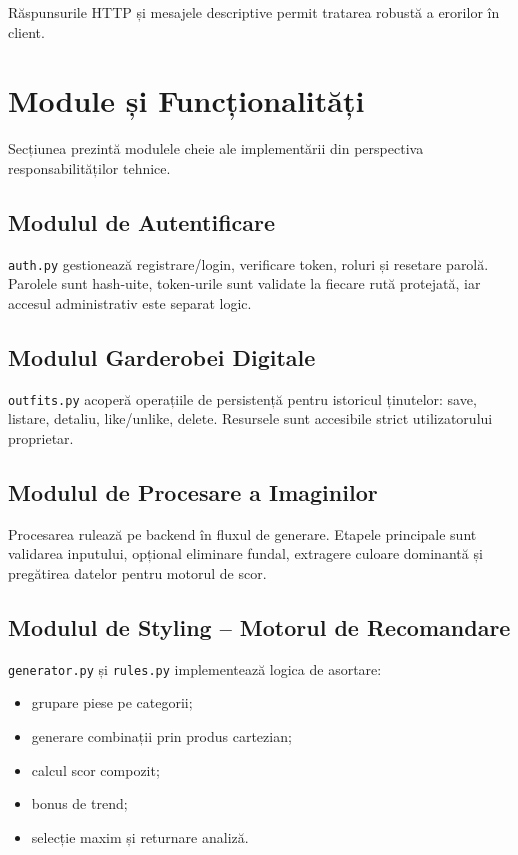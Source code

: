 Răspunsurile HTTP și mesajele descriptive permit tratarea robustă a erorilor în client.

\section{Module și Funcționalități}

Secțiunea prezintă modulele cheie ale implementării din perspectiva responsabilităților tehnice.

\subsection{Modulul de Autentificare}

\texttt{auth.py} gestionează registrare/login, verificare token, roluri și resetare parolă. Parolele sunt hash-uite, token-urile sunt validate la fiecare rută protejată, iar accesul administrativ este separat logic.

\subsection{Modulul Garderobei Digitale}

\texttt{outfits.py} acoperă operațiile de persistență pentru istoricul ținutelor: save, listare, detaliu, like/unlike, delete. Resursele sunt accesibile strict utilizatorului proprietar.

\subsection{Modulul de Procesare a Imaginilor}

Procesarea rulează pe backend în fluxul de generare. Etapele principale sunt validarea inputului, opțional eliminare fundal, extragere culoare dominantă și pregătirea datelor pentru motorul de scor.

\subsection{Modulul de Styling -- Motorul de Recomandare}

\texttt{generator.py} și \texttt{rules.py} implementează logica de asortare:
\begin{itemize}
    \item grupare piese pe categorii;
    \item generare combinații prin produs cartezian;
    \item calcul scor compozit;
    \item bonus de trend;
    \item selecție maxim și returnare analiză.
\end{itemize}

